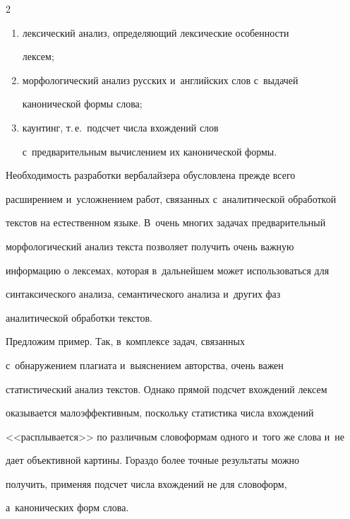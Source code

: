 \begin{multicols}{2}
     \begin{enumerate}[(1)]


     \item лексический анализ, определяющий лексические особенности 


лексем;


     \item морфологический анализ русских и~английских слов с~выдачей 


канонической формы слова;


     \item каунтинг, т.\,е.\ подсчет числа вхождений слов 


с~предварительным вычислением их канонической формы. 


     \end{enumerate}


     


     Необходимость разработки вербалайзера обусловлена прежде всего 


расширением и~усложнением работ, связанных с~аналитической обработкой 


текстов на естественном языке. В~очень многих задачах предварительный 


морфологический анализ текста позволяет получить очень важную 


информацию о лексемах, которая в~дальнейшем может использоваться для 


синтаксического анализа, семантического анализа и~других фаз 


аналитической обработки текстов. 


     


     Предложим пример. Так, в~комплексе задач, связанных 


с~обнаружением плагиата и~выяснением авторства, очень важен 


статистический анализ текстов. Однако прямой подсчет вхождений лексем 


оказывается малоэффективным, поскольку статистика числа вхождений 


<<расплывается>> по различным словоформам одного и~того же слова и~не 


дает объективной картины. Гораздо более точные результаты можно 


получить, применяя подсчет числа вхождений не для словоформ, 


а~канонических форм слова.



\end{multicols}
